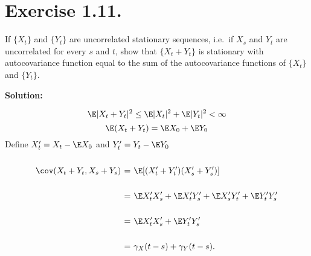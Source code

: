 \section*{Exercise 1.11.}

If $\{X_t\}$ and $\{Y_t\}$ are uncorrelated stationary sequences, i.e.~if $X_s$ and $Y_t$ are uncorrelated for every $s$ and $t$, show that $\{X_t + Y_t\}$ is stationary with autocovariance function equal to the sum of the autocovariance functions of $\{X_t\}$ and $\{Y_t\}$.

\textbf{Solution:}

\[ \E|X_t+Y_t|^2 \leq \E|X_t|^2 + \E |Y_t|^2 < \infty \]
\[ \E (X_t + Y_t) = \E X_0 + \E Y_0 \]
Define $X'_t = X_t - \E X_0$ and $Y'_t = Y_t - \E Y_0$
\[ \everymath{\displaystyle}
\arraycolsep=1.8pt\def\arraystretch{2.5}
\begin{array}{rcl}
    \cov(X_t + Y_t, X_s + Y_s) & = & \E[(X_t'+Y_t')(X_s'+Y_s')]\\
    & = & \E X_t' X_s' + \E X_t' Y_s' + \E X_s' Y_t' + \E Y_t' Y_s'\\
    & = & \E X_t' X_s' + \E Y_t' Y_s'\\
    & = & \gamma_X(t-s) + \gamma_Y(t-s).
\end{array} \]